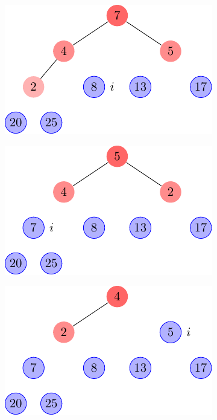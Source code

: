 \begin{description}
\begin{ex}
\begin{figure}[H]
\begin{subfigure}[t]{.30\textwidth}
          \caption{}\label{fig:6_4-1_6}
        \end{subfigure}
        \begin{subfigure}[t]{.30\textwidth}
          \centering
          \includegraphics[scale=0.8]{img/6_4-1/6_4-1_7}
          \caption{}\label{fig:6_4-1_7}
        \end{subfigure}
        \begin{subfigure}[t]{.30\textwidth}
          \centering
          \includegraphics[scale=0.8]{img/6_4-1/6_4-1_8}
          \caption{}\label{fig:6_4-1_8}
        \end{subfigure}
        \begin{subfigure}[t]{.30\textwidth}
          \centering
          \includegraphics[scale=0.8]{img/6_4-1/6_4-1_9}
          \caption{}\label{fig:6_4-1_9}
        \end{subfigure}
        \begin{subfigure}[t]{.30\textwidth}

\end{subfigure}
\end{figure}
\end{ex}
\end{description}
